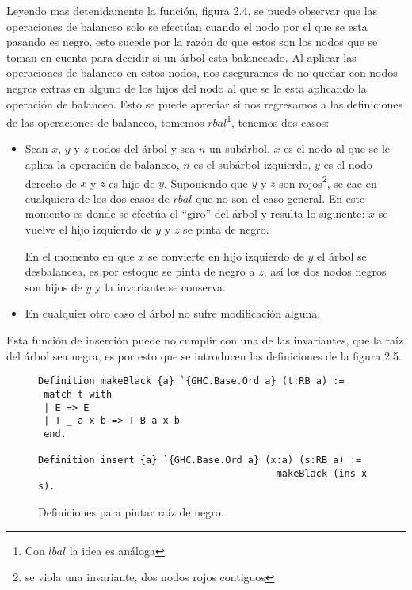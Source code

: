 Leyendo mas detenidamente la funci\'on, figura 2.4, se puede observar que las operaciones de
balanceo solo se efectúan cuando el nodo por el que se esta pasando es negro, esto sucede por la
raz\'on de que estos son los nodos  que se toman en cuenta para decidir si un \'arbol esta
balanceado. Al aplicar las operaciones de balanceo en estos nodos, nos aseguramos de no quedar con
nodos negros extras en alguno de los hijos del nodo al que se le esta aplicando la operación de
balanceo. Esto se puede apreciar si nos regresamos a las definiciones de las operaciones de
balanceo, tomemos $rbal$\footnote{Con $lbal$ la idea es an\'aloga}, tenemos dos casos:

\begin{itemize}
    \item Sean $x$, $y$ y $z$ nodos del \'arbol y sea $n$ un subárbol, $x$ es el nodo al que se le
    aplica la operaci\'on de balanceo, $n$ es el subárbol izquierdo, $y$ es el nodo derecho  de $x$
    y $z$ es hijo de $y$. Suponiendo que $y$ y $z$ son rojos\footnote{se viola una invariante, dos
    nodos rojos contiguos}, se cae en cualquiera de los dos casos de $rbal$ que no son el caso
    general. En este momento es donde se efectúa el ``giro'' del árbol y resulta lo siguiente: $x$
    se vuelve el hijo izquierdo de $y$ y $z$ se pinta de negro.

    En el momento en que $x$ se convierte en hijo izquierdo de $y$ el \'arbol se desbalancea, es
    por estoque se pinta de negro a $z$, así los dos nodos negros son hijos de $y$ y la invariante
    se conserva.
    \item En cualquier otro caso el \'arbol no sufre modificaci\'on alguna.
\end{itemize}{}

Esta función de inserción puede no cumplir con una de las invariantes, que la raíz del árbol sea
negra, es por esto que se introducen las definiciones de la figura 2.5.

\begin{figure}
\centering
\captionsetup{justification=centering}
\begin{verbatim}
Definition makeBlack {a} `{GHC.Base.Ord a} (t:RB a) :=
 match t with
 | E => E
 | T _ a x b => T B a x b
 end.

Definition insert {a} `{GHC.Base.Ord a} (x:a) (s:RB a) :=
                                          makeBlack (ins x s).
\end{verbatim}
\caption{Definiciones para pintar ra\'iz de negro.}
\end{figure}


